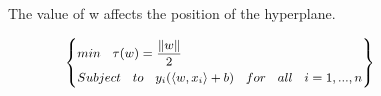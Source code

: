 \documentclass[twocolumn]{bmcart}%
\begin{document}
\begin{figure}[!ht]

    \center
	\vspace{2mm}
    \label{fig1}
    \caption{The value of w affects the position of the hyperplane.}
\end{figure}
\vspace{2mm}


\begin{equation}\small
  \left\{
  \begin{aligned}
  &min \hspace{0.3cm} \tau(w)={\frac{\|w\|}{2}} \\
  &Subject \hspace{0.3cm} to \hspace{0.3cm}  y_{i}(\langle w, x_{i}\rangle + b) \hspace{0.3cm} for \hspace{0.3cm} all \hspace{0.3cm} i= 1,...,n
  \end{aligned}
  \right\}
\end{equation}
\end{document}
